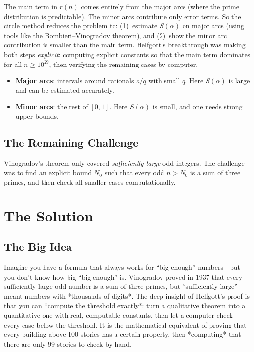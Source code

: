 The main term in $r(n)$ comes entirely from the major arcs (where the prime distribution is predictable). The minor arcs contribute only error terms. So the circle method reduces the problem to: (1)~estimate $S(\alpha)$ on major arcs (using tools like the Bombieri--Vinogradov theorem), and (2)~show the minor arc contribution is smaller than the main term. Helfgott's breakthrough was making both steps \emph{explicit}: computing explicit constants so that the main term dominates for all $n \geq 10^{29}$, then verifying the remaining cases by computer.
\begin{itemize}
\item \textbf{Major arcs}: intervals around rationals $a/q$ with small $q$. Here $S(\alpha)$ is large and can be estimated accurately.
\item \textbf{Minor arcs}: the rest of $[0,1]$. Here $S(\alpha)$ is small, and one needs strong upper bounds.
\end{itemize}

\subsection{The Remaining Challenge}

Vinogradov's theorem only covered \emph{sufficiently large} odd integers. The challenge was to find an explicit bound $N_0$ such that every odd $n > N_0$ is a sum of three primes, and then check all smaller cases computationally.

\section{The Solution}

\subsection{The Big Idea}
Imagine you have a formula that always works for ``big enough'' numbers---but you don't know how big ``big enough'' is. Vinogradov proved in 1937 that every sufficiently large odd number is a sum of three primes, but ``sufficiently large'' meant numbers with *thousands of digits*. The deep insight of Helfgott's proof is that you can *compute the threshold exactly*: turn a qualitative theorem into a quantitative one with real, computable constants, then let a computer check every case below the threshold. It is the mathematical equivalent of proving that every building above 100 stories has a certain property, then *computing* that there are only 99 stories to check by hand.


